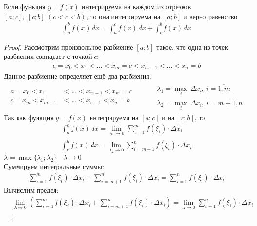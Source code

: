 \newpage
\begin{theorem}
    Если функция $y=f(x)$ интегрируема на каждом из отрезков $[a;c],\ [c;b]\ (a < c < b)$, то она интегрируема на $[a;b]$ и верно равенство
    \begin{gather*}
        \boxed{\int_{a}^{b} f(x)\, dx = \int_{a}^{c} f(x)\, dx + \int_{c}^{b} f(x)\, dx}
    \end{gather*}
\end{theorem}
\begin{proof}
    Рассмотрим произвольное разбиение $[a;b]$ такое, что одна из точек разбиения совпадает с точкой $c$:
    \begin{gather*}
        a = x_0 < x_1 < \ldots < x_m = c < x_{m+1} < \ldots < x_n = b
    \end{gather*}
    Данное разбиение определяет ещё два разбиения:
    \begin{gather*}
        \begin{aligned}
            a = x_0 < x_1 &< \ldots < x_{m-1} < x_m = c\\
            c = x_m < x_{m+1} &< \ldots < x_{n-1} < x_n = b
        \end{aligned}\qquad
        \begin{aligned}
            &\lambda_1 = \underset{i}{\max}\, \Delta x_i,\ i = \overline{1, m} \\
            &\lambda_2 = \underset{i}{\max}\, \Delta x_i,\ i = \overline{m+1, n}
        \end{aligned}
    \end{gather*}
    Так как функция $y=f(x)$ интегрируема на $[a;c]$ и на $[c;b]$, то
    \begin{gather*}
        \int_{a}^{c} f(x)\, dx = \lim_{\lambda_1 \to 0} \sum_{i = 1}^{m} f(\xi_i) \cdot \Delta x_i\\
        \int_{c}^{b} f(x)\, dx = \lim_{\lambda_2 \to 0} \sum_{i = m + 1}^{n} f(\xi_i) \cdot \Delta x_i
    \end{gather*}
    $\lambda = \max \{\lambda_1; \lambda_2\}\quad \lambda \to 0$\\
    Суммируем интегральные суммы:
    \begin{gather*}
        \sum_{i = 1}^{m} f(\xi_i) \cdot \Delta x_i + \sum_{i = m + 1}^{n} f(\xi_i) \cdot \Delta x_i = \sum_{i=1}^{n} f(\xi_i)\cdot \Delta x_i
    \end{gather*}
    Вычислим предел:
    \begin{align*}
        &\lim_{\lambda \to 0} \left( \sum_{i=1}^{m} f(\xi_i)\cdot \Delta x_i + \sum_{i=m+1}^{n} f(\xi_i) \cdot \Delta x_i \right) = \lim_{\lambda \to 0} \sum_{i=1}^{n} f(\xi_i) \cdot \Delta x_i \\

\end{align*}
\end{proof}
